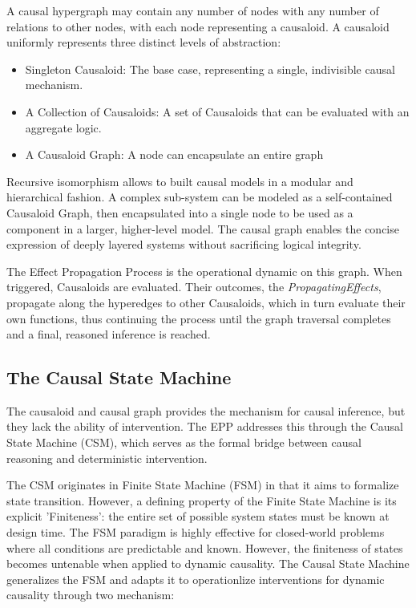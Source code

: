 A causal hypergraph may contain any number of nodes with any number of relations to other nodes, with each node representing a causaloid. A causaloid uniformly represents three distinct levels of abstraction:

\begin{itemize}
 	\item Singleton Causaloid: The base case, representing a single, indivisible causal mechanism.
 	\item A Collection of Causaloids: A set of Causaloids that can be evaluated with an aggregate logic. 
 	\item A  Causaloid Graph: A node can encapsulate an entire graph
\end{itemize}

Recursive isomorphism allows to built causal models in a modular and hierarchical fashion. 
A complex sub-system can be modeled as a self-contained Causaloid Graph, then encapsulated into a single node to be used as a component in a larger, higher-level model. The causal graph enables the concise expression of deeply layered systems without sacrificing logical integrity.

The Effect Propagation Process is the operational dynamic on this graph. When triggered, Causaloids are evaluated. Their outcomes, the \textit{PropagatingEffects}, propagate along the hyperedges to other Causaloids, which in turn evaluate their own functions, thus continuing the process until the graph traversal completes and a final, reasoned inference is reached.

\subsection{The Causal State Machine}
\label{sec:epp_csm}

The causaloid and causal graph provides the mechanism for causal inference, 
but they lack the ability of intervention. The EPP addresses this through the Causal State Machine (CSM), which serves as the formal bridge between causal reasoning and deterministic intervention.

The CSM originates in Finite State Machine (FSM) in that it aims to formalize state transition.
However, a defining property of the Finite State Machine is its explicit 'Finiteness': the entire set of possible system states must be known at design time. The FSM paradigm is highly effective for closed-world problems where all conditions are predictable and known. However, the finiteness of states becomes untenable when applied to dynamic causality. The Causal State Machine generalizes the FSM and adapts it 
to operationlize interventions for dynamic causality through two mechanism:
 
